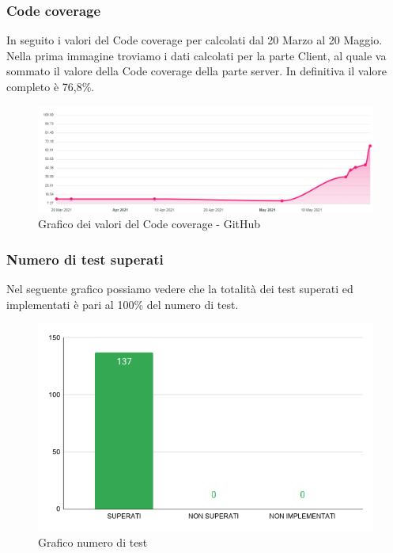 \subsubsection{Code coverage}
 In seguito i valori del Code coverage per calcolati dal 20 Marzo al 20 Maggio.
 Nella prima immagine troviamo i dati calcolati per la parte Client, al quale va sommato il valore della Code coverage della parte server.
 In definitiva il valore completo è 76,8\%.
    \begin{figure}[H]
        \centering
        \includegraphics[width=16 cm]{source/sections/images/CodeCoverage.png}
        \caption{Grafico dei valori del Code coverage - GitHub}
    \end{figure}


\subsubsection{Numero di test superati}
Nel seguente grafico possiamo vedere che la totalità dei test superati ed implementati è pari al 100\% del numero di test.
    \begin{figure}[H]
        \centering
        \includegraphics[width=10 cm]{source/sections/images/num-test.png}
        \caption{Grafico numero di test}
    \end{figure}
